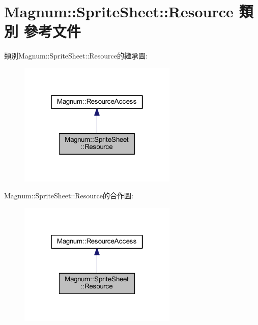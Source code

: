 \hypertarget{class_magnum_1_1_sprite_sheet_1_1_resource}{}\section{Magnum\+:\+:Sprite\+Sheet\+:\+:Resource 類別 參考文件}
\label{class_magnum_1_1_sprite_sheet_1_1_resource}


類別\+Magnum\+:\+:Sprite\+Sheet\+:\+:Resource的繼承圖\+:\nopagebreak
\begin{figure}[H]
\begin{center}
\leavevmode
\includegraphics[width=214pt]{class_magnum_1_1_sprite_sheet_1_1_resource__inherit__graph}
\end{center}
\end{figure}


Magnum\+:\+:Sprite\+Sheet\+:\+:Resource的合作圖\+:\nopagebreak
\begin{figure}[H]
\begin{center}
\leavevmode
\includegraphics[width=214pt]{class_magnum_1_1_sprite_sheet_1_1_resource__coll__graph}
\end{center}
\end{figure}
